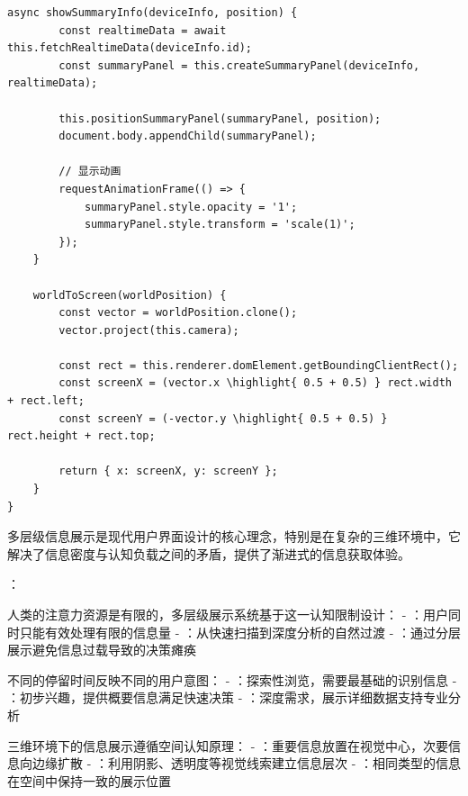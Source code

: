 \begin{lstlisting}[style=javascript]
    async showSummaryInfo(deviceInfo, position) {
        const realtimeData = await this.fetchRealtimeData(deviceInfo.id);
        const summaryPanel = this.createSummaryPanel(deviceInfo, realtimeData);
        
        this.positionSummaryPanel(summaryPanel, position);
        document.body.appendChild(summaryPanel);
        
        // 显示动画
        requestAnimationFrame(() => {
            summaryPanel.style.opacity = '1';
            summaryPanel.style.transform = 'scale(1)';
        });
    }
    
    worldToScreen(worldPosition) {
        const vector = worldPosition.clone();
        vector.project(this.camera);
        
        const rect = this.renderer.domElement.getBoundingClientRect();
        const screenX = (vector.x \highlight{ 0.5 + 0.5) } rect.width + rect.left;
        const screenY = (-vector.y \highlight{ 0.5 + 0.5) } rect.height + rect.top;
        
        return { x: screenX, y: screenY };
    }
}
\end{lstlisting}


多层级信息展示是现代用户界面设计的核心理念，特别是在复杂的三维环境中，它解决了信息密度与认知负载之间的矛盾，提供了渐进式的信息获取体验。

：


人类的注意力资源是有限的，多层级展示系统基于这一认知限制设计： - ：用户同时只能有效处理有限的信息量 - ：从快速扫描到深度分析的自然过渡 - ：通过分层展示避免信息过载导致的决策瘫痪


不同的停留时间反映不同的用户意图： - ：探索性浏览，需要最基础的识别信息 - ：初步兴趣，提供概要信息满足快速决策 - ：深度需求，展示详细数据支持专业分析


三维环境下的信息展示遵循空间认知原理： - ：重要信息放置在视觉中心，次要信息向边缘扩散 - ：利用阴影、透明度等视觉线索建立信息层次 - ：相同类型的信息在空间中保持一致的展示位置

